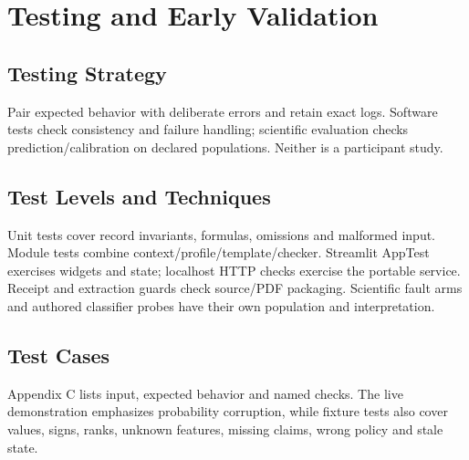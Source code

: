 \chapter{Testing and Early Validation}
\label{chap:testing}
\section{Testing Strategy}
Pair expected behavior with deliberate errors and retain exact logs. Software tests check consistency and failure handling; scientific evaluation checks prediction/calibration on declared populations. Neither is a participant study.
\section{Test Levels and Techniques}
Unit tests cover record invariants, formulas, omissions and malformed input. Module tests combine context/profile/template/checker. Streamlit AppTest exercises widgets and state; localhost HTTP checks exercise the portable service. Receipt and extraction guards check source/PDF packaging. Scientific fault arms and authored classifier probes have their own population and interpretation.
\section{Test Cases}
Appendix C lists input, expected behavior and named checks. The live demonstration emphasizes probability corruption, while fixture tests also cover values, signs, ranks, unknown features, missing claims, wrong policy and stale state.
